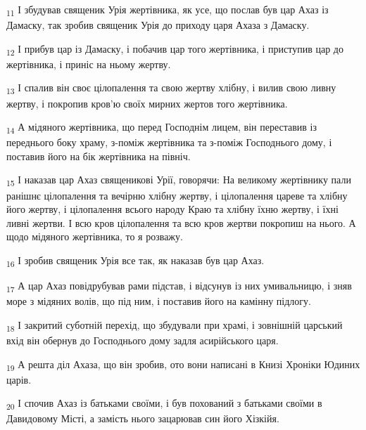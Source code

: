 \begin{tcolorbox}
\textsubscript{11} І збудував священик Урія жертівника, як усе, що послав був цар Ахаз із Дамаску, так зробив священик Урія до приходу царя Ахаза з Дамаску.
\end{tcolorbox}
\begin{tcolorbox}
\textsubscript{12} І прибув цар із Дамаску, і побачив цар того жертівника, і приступив цар до жертівника, і приніс на ньому жертву.
\end{tcolorbox}
\begin{tcolorbox}
\textsubscript{13} І спалив він своє цілопалення та свою жертву хлібну, і вилив свою ливну жертву, і покропив кров'ю своїх мирних жертов того жертівника.
\end{tcolorbox}
\begin{tcolorbox}
\textsubscript{14} А мідяного жертівника, що перед Господнім лицем, він переставив із переднього боку храму, з-поміж жертівника та з-поміж Господнього дому, і поставив його на бік жертівника на північ.
\end{tcolorbox}
\begin{tcolorbox}
\textsubscript{15} І наказав цар Ахаз священикові Урії, говорячи: На великому жертівнику пали ранішнє цілопалення та вечірню хлібну жертву, і цілопалення цареве та хлібну його жертву, і цілопалення всього народу Краю та хлібну їхню жертву, і їхні ливні жертви. І всю кров цілопалення та всю кров жертви покропиш на нього. А щодо мідяного жертівника, то я розважу.
\end{tcolorbox}
\begin{tcolorbox}
\textsubscript{16} І зробив священик Урія все так, як наказав був цар Ахаз.
\end{tcolorbox}
\begin{tcolorbox}
\textsubscript{17} А цар Ахаз повідрубував рами підстав, і відсунув із них умивальницю, і зняв море з мідяних волів, що під ним, і поставив його на камінну підлогу.
\end{tcolorbox}
\begin{tcolorbox}
\textsubscript{18} І закритий суботній перехід, що збудували при храмі, і зовнішній царський вхід він обернув до Господнього дому задля асирійського царя.
\end{tcolorbox}
\begin{tcolorbox}
\textsubscript{19} А решта діл Ахаза, що він зробив, ото вони написані в Книзі Хроніки Юдиних царів.
\end{tcolorbox}
\begin{tcolorbox}
\textsubscript{20} І спочив Ахаз із батьками своїми, і був похований з батьками своїми в Давидовому Місті, а замість нього зацарював син його Хізкійя.
\end{tcolorbox}
